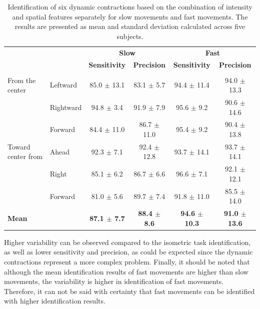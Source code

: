 \begin{table}[]
\centering
\caption{Identification of six dynamic contractions based on the combination of intensity and spatial features separately for slow movements and fast movements. The results are presented as mean and standard deviation calculated across five subjects.}
\label{tb:4-4}
\begin{tabular}{llcccc}
                   &           & \multicolumn{2}{c}{\textbf{Slow}}           & \multicolumn{2}{c}{\textbf{Fast}}           \\
                   &           & \textbf{Sensitivity} & \textbf{Precision}   & \textbf{Sensitivity} & \textbf{Precision}   \\ \hline
                   &           & \multicolumn{1}{l}{} & \multicolumn{1}{l}{} & \multicolumn{1}{l}{} & \multicolumn{1}{l}{} \\
From the center    & Leftward  & 85.0 $\pm$ 13.1          & 83.1 $\pm$ 5.7           & 94.4 $\pm$ 11.4          & 94.0 $\pm$ 13.3          \\
                   & Rightward & 94.8 $\pm$ 3.4           & 91.9 $\pm$ 7.9           & 95.6 $\pm$ 9.2           & 90.6 $\pm$ 14.6          \\
                   & Forward   & 84.4 $\pm$ 11.0          & 86.7 $\pm$ 11.0          & 95.4 $\pm$ 9.2           & 90.4 $\pm$ 13.8          \\ \hline
Toward center from & Ahead     & 92.3 $\pm$ 7.1           & 92.4 $\pm$ 12.8          & 93.7 $\pm$ 14.1          & 93.7 $\pm$ 14.1          \\
                   & Right     & 85.1 $\pm$ 6.2           & 86.7 $\pm$ 6.6           & 96.6 $\pm$ 7.1           & 92.1 $\pm$ 12.1          \\
                   & Forward   & 81.0 $\pm$ 5.6           & 89.7 $\pm$ 7.4           & 91.8 $\pm$ 11.0          & 85.5 $\pm$ 14.0          \\ \hline
\textbf{Mean}      & \textbf{} & \textbf{87.1 $\pm$ 7.7}  & \textbf{88.4 $\pm$ 8.6}  & \textbf{94.6 $\pm$ 10.3} & \textbf{91.0 $\pm$ 13.6}
\end{tabular}
\end{table}

Higher variability can be observed compared to the isometric task identification, as well as lower sensitivity and precision, as could be expected since the dynamic contractions represent a more complex problem. Finally, it should be noted that although the mean identification results of fast movements are higher than slow movements, the variability is higher in identification of fast movements. Therefore, it can not be said with certainty that fast movements can be identified with higher identification results.


